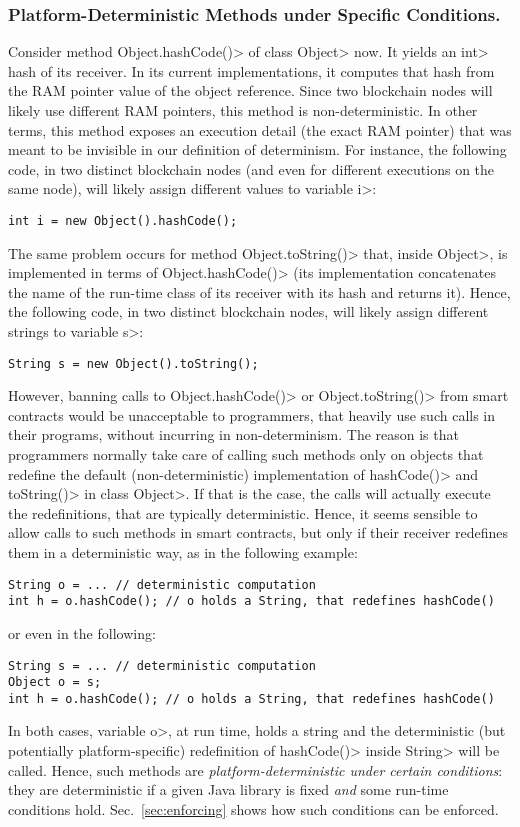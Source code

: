 \subsubsection*{Platform-Deterministic Methods under Specific Conditions.}
Consider method \<Object.hashCode()> of class \<Object> now. It yields an \<int>
hash of its receiver. In its current implementations, it computes that hash from the
RAM pointer value of the object reference.
Since two blockchain nodes will likely use different RAM pointers,
this method is non-deterministic.
In other terms, this method exposes an execution detail (the exact RAM pointer)
that was meant to be invisible in our definition of determinism.
For instance, the following code, in two distinct blockchain nodes
(and even for different executions on the same node),
will likely assign different values to variable \<i>:
%
\begin{verbatim}
int i = new Object().hashCode();
\end{verbatim}
%
The same problem occurs for method \<Object.toString()> that, inside
\<Object>, is implemented in terms of \<Object.hashCode()> (its
implementation concatenates
the name of the run-time class of its receiver with its hash and returns it).
Hence, the following code, in two distinct blockchain nodes,
will likely assign different strings to variable \<s>:
%
\begin{verbatim}
String s = new Object().toString();
\end{verbatim}
%
However, banning calls to \<Object.hashCode()> or \<Object.toString()>
from smart contracts would be unacceptable to programmers, that
heavily use such calls in their programs, without incurring in
non-determinism. The reason is that programmers normally
take care of calling such methods only on objects that redefine
the default (non-deterministic) implementation of
\<hashCode()> and \<toString()> in class \<Object>.
If that is the case, the calls will actually
execute the redefinitions, that are typically deterministic. Hence, it seems sensible
to allow calls to such methods in smart contracts, but only if their receiver
redefines them in a deterministic way, as in the following example:
%
\begin{verbatim}
String o = ... // deterministic computation
int h = o.hashCode(); // o holds a String, that redefines hashCode()
\end{verbatim}
%
or even in the following:
%
\begin{verbatim}
String s = ... // deterministic computation
Object o = s;
int h = o.hashCode(); // o holds a String, that redefines hashCode()
\end{verbatim}
%
In both cases, variable \<o>, at run time,
holds a string and the deterministic (but potentially platform-specific)
redefinition of \<hashCode()> inside \<String> will be called.
Hence, such methods are \emph{platform-deterministic under certain conditions}:
they are deterministic if a given Java library is fixed \emph{and} some run-time conditions hold.
Sec.~\ref{sec:enforcing} shows how such conditions can be enforced.

